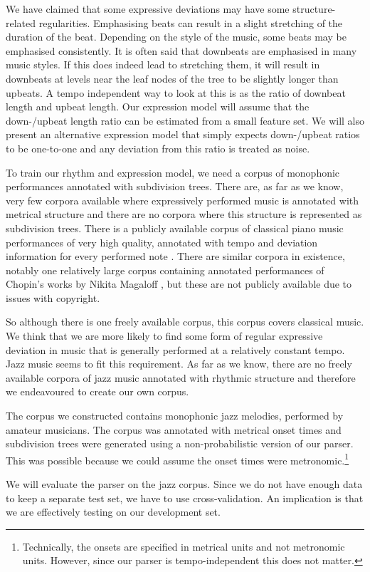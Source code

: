 We have claimed that some expressive deviations may have some structure-related regularities. Emphasising beats can result in a slight stretching of the duration of the beat. Depending on the style of the music, some beats may be emphasised consistently. It is often said that downbeats are emphasised in many music styles. If this does indeed lead to stretching them, it will result in downbeats at levels near the leaf nodes of the tree to be slightly longer than upbeats. A tempo independent way to look at this is as the ratio of downbeat length and upbeat length. Our expression model will assume that the down-/upbeat length ratio can be estimated from a small feature set. We will also present an alternative expression model that simply expects down-/upbeat ratios to be one-to-one and any deviation from this ratio is treated as noise.

To train our rhythm and expression model, we need a corpus of monophonic performances annotated with subdivision trees. There are, as far as we know, very few corpora available where expressively performed music is annotated with metrical structure and there are no corpora where this structure is represented as subdivision trees. There is a publicly available corpus of classical piano music performances of very high quality, annotated with tempo and deviation information for every performed note \citep{hashida2008new}. There are similar corpora in existence, notably one relatively large corpus containing annotated performances of Chopin's works by Nikita Magaloff \citep{flossmann2010magaloff}, but these are not publicly available due to issues with copyright. 

So although there is one freely available corpus, this corpus covers classical music. We think that we are more likely to find some form of regular expressive deviation in music that is generally performed at a relatively constant tempo. Jazz music seems to fit this requirement. As far as we know, there are no freely available corpora of jazz music annotated with rhythmic structure and therefore we endeavoured to create our own corpus.

The corpus we constructed contains monophonic jazz melodies, performed by amateur musicians. The corpus was annotated with metrical onset times and subdivision trees were generated using a non-probabilistic version of our parser. This was possible because we could assume the onset times were metronomic.\footnote{Technically, the onsets are specified in metrical units and not metronomic units. However, since our parser is tempo-independent this does not matter.}

We will evaluate the parser on the jazz corpus. Since we do not have enough data to keep a separate test set, we have to use cross-validation. An implication is that we are effectively testing on our development set.
